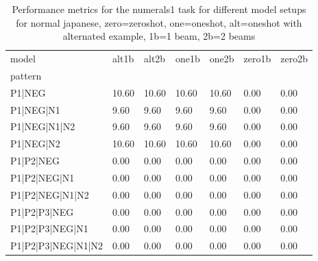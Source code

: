 \begin{table}[h]
\begin{tabular}{l|llllll}
\toprule
model & alt1b & alt2b & one1b & one2b & zero1b & zero2b \\
pattern &  &  &  &  &  &  \\
\midrule
P1|NEG & 10.60 & 10.60 & 10.60 & 10.60 & 0.00 & 0.00 \\
P1|NEG|N1 & 9.60 & 9.60 & 9.60 & 9.60 & 0.00 & 0.00 \\
P1|NEG|N1|N2 & 9.60 & 9.60 & 9.60 & 9.60 & 0.00 & 0.00 \\
P1|NEG|N2 & 10.60 & 10.60 & 10.60 & 10.60 & 0.00 & 0.00 \\
P1|P2|NEG & 0.00 & 0.00 & 0.00 & 0.00 & 0.00 & 0.00 \\
P1|P2|NEG|N1 & 0.00 & 0.00 & 0.00 & 0.00 & 0.00 & 0.00 \\
P1|P2|NEG|N1|N2 & 0.00 & 0.00 & 0.00 & 0.00 & 0.00 & 0.00 \\
P1|P2|P3|NEG & 0.00 & 0.00 & 0.00 & 0.00 & 0.00 & 0.00 \\
P1|P2|P3|NEG|N1 & 0.00 & 0.00 & 0.00 & 0.00 & 0.00 & 0.00 \\
P1|P2|P3|NEG|N1|N2 & 0.00 & 0.00 & 0.00 & 0.00 & 0.00 & 0.00 \\
\bottomrule
\end{tabular}
\caption{Performance metrics for the numerals1 task for different model setups for normal japanese, zero=zeroshot, one=oneshot, alt=oneshot with alternated example, 1b=1 beam, 2b=2 beams}
\label{tab:ja norm_numerals1_performance}
\end{table}
